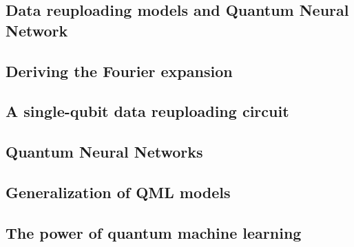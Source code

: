 \subsection{Data reuploading models and Quantum Neural Network}

\subsection{Deriving the Fourier expansion}

\subsection{A single-qubit data reuploading circuit}

\subsection{Quantum Neural Networks}

\subsection{Generalization of QML models}

\subsection{The power of quantum machine learning}







